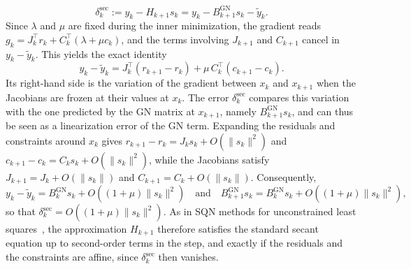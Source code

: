 \documentclass{article}
\numberwithin{equation}{section}
\theoremstyle{plain}
\begin{document}
\begin{equation}\label{eq:secant_error}
	\delta^{\mathrm{sec}}_k := y_k - H_{k+1}s_k = y_k - B^{\mathrm{GN}}_{k+1}s_k - \tilde{y}_k.
\end{equation}
Since $\lambda$ and $\mu$ are fixed during the inner minimization, the gradient reads $g_k = J_k^\top r_k + C_k^\top(\lambda + \mu c_k)$, and the terms involving $J_{k+1}$ and $C_{k+1}$ cancel in $y_k - \tilde{y}_k$. This yields the exact identity
\[y_k - \tilde{y}_k = J_k^\top\left(r_{k+1}-r_k\right) + \mu\, C_k^\top\left(c_{k+1}-c_k\right).\]
Its right-hand side is the variation of the gradient between $x_k$ and $x_{k+1}$ when the Jacobians are frozen at their values at $x_k$. The error $\delta^{\mathrm{sec}}_k$ compares this variation with the one predicted by the GN matrix at $x_{k+1}$, namely $B^{\mathrm{GN}}_{k+1}s_k$, and can thus be seen as a linearization error of the GN term. Expanding the residuals and constraints around $x_k$ gives $r_{k+1}-r_k = J_ks_k + O(\|s_k\|^2)$ and $c_{k+1}-c_k = C_ks_k + O(\|s_k\|^2)$, while the Jacobians satisfy $J_{k+1} = J_k + O(\|s_k\|)$ and $C_{k+1} = C_k + O(\|s_k\|)$. Consequently,
\[y_k - \tilde{y}_k = B^{\mathrm{GN}}_ks_k + O\left((1+\mu)\|s_k\|^2\right) \quad \text{and} \quad B^{\mathrm{GN}}_{k+1}s_k = B^{\mathrm{GN}}_ks_k + O\left((1+\mu)\|s_k\|^2\right),\]
so that $\delta^{\mathrm{sec}}_k = O((1+\mu)\|s_k\|^2)$. As in SQN methods for unconstrained least squares~\cite{lucksan-etal:2019}, the approximation $H_{k+1}$ therefore satisfies the standard secant equation up to second-order terms in the step, and exactly if the residuals and the constraints are affine, since $\delta^{\mathrm{sec}}_k$ then vanishes.
\end{document}

